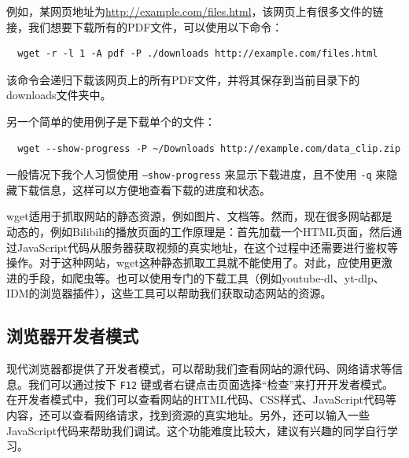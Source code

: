 例如，某网页地址为\url{http://example.com/files.html}，该网页上有很多文件的链接，我们想要下载所有的PDF文件，可以使用以下命令：
\begin{verbatim}
  wget -r -l 1 -A pdf -P ./downloads http://example.com/files.html
\end{verbatim}
该命令会递归下载该网页上的所有PDF文件，并将其保存到当前目录下的downloads文件夹中。

另一个简单的使用例子是下载单个的文件：
\begin{verbatim}
  wget --show-progress -P ~/Downloads http://example.com/data_clip.zip
\end{verbatim}
一般情况下我个人习惯使用 \texttt{--show-progress} 来显示下载进度，且不使用 \texttt{-q} 来隐藏下载信息，这样可以方便地查看下载的进度和状态。

wget适用于抓取网站的静态资源，例如图片、文档等。然而，现在很多网站都是动态的，例如Bilibili的播放页面的工作原理是：首先加载一个HTML页面，然后通过JavaScript代码从服务器获取视频的真实地址，在这个过程中还需要进行鉴权等操作。对于这种网站，wget这种静态抓取工具就不能使用了。对此，应使用更激进的手段，如爬虫等。也可以使用专门的下载工具（例如youtube-dl、yt-dlp、IDM的浏览器插件），这些工具可以帮助我们获取动态网站的资源。

\subsection{浏览器开发者模式}

现代浏览器都提供了开发者模式，可以帮助我们查看网站的源代码、网络请求等信息。我们可以通过按下 \texttt{F12} 键或者右键点击页面选择“检查”来打开开发者模式。在开发者模式中，我们可以查看网站的HTML代码、CSS样式、JavaScript代码等内容，还可以查看网络请求，找到资源的真实地址。另外，还可以输入一些JavaScript代码来帮助我们调试。这个功能难度比较大，建议有兴趣的同学自行学习。
